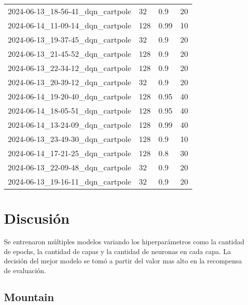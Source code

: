 \documentclass[a4paper,12pt]{article}
\begin{document}
\begin{center}
{\begin{tabular}{llll}
            2024-06-13\_18-56-41\_dqn\_cartpole & 32          & 0.9      & 20                    \\
            2024-06-14\_11-09-14\_dqn\_cartpole & 128         & 0.99     & 10                    \\
            2024-06-13\_19-37-45\_dqn\_cartpole & 32          & 0.9      & 20                    \\
            2024-06-13\_21-45-52\_dqn\_cartpole & 128         & 0.9      & 20                    \\
            2024-06-13\_22-34-12\_dqn\_cartpole & 128         & 0.9      & 20                    \\
            2024-06-13\_20-39-12\_dqn\_cartpole & 32          & 0.9      & 20                    \\
            2024-06-14\_19-20-40\_dqn\_cartpole & 128         & 0.95     & 40                    \\
            2024-06-14\_18-05-51\_dqn\_cartpole & 128         & 0.95     & 40                    \\
            2024-06-14\_13-24-09\_dqn\_cartpole & 128         & 0.99     & 40                    \\
            2024-06-13\_23-49-30\_dqn\_cartpole & 128         & 0.9      & 10                    \\
            2024-06-14\_17-21-25\_dqn\_cartpole & 128         & 0.8      & 30                    \\
            2024-06-13\_22-09-48\_dqn\_cartpole & 32          & 0.9      & 20                    \\
            2024-06-13\_19-16-11\_dqn\_cartpole & 32          & 0.9      & 20
        \end{tabular}
    }
\end{center}

\section{Discusión}
Se entrenaron múltiples modelos variando los hiperparámetros como la cantidad de epochs, la cantidad de capas y la cantidad de neuronas en cada capa. La decisión del mejor modelo se tomó a partir del valor mas alto en la recompensa de evaluación.

\subsection{Mountain}

\end{document}
